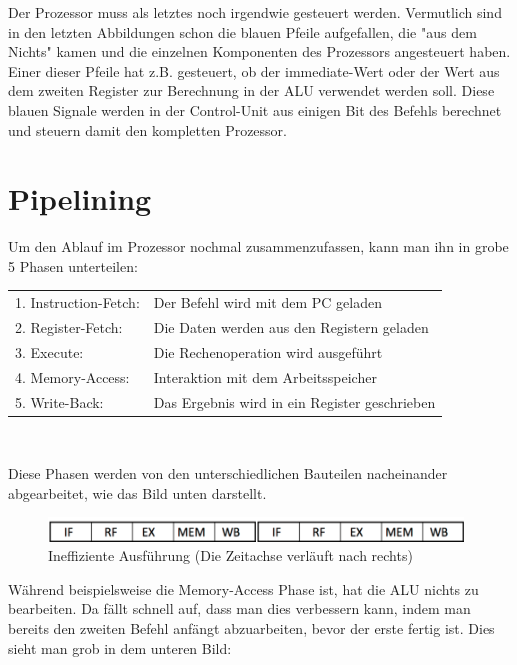 \documentclass[12pt, a4paper]{article}
\begin{document}
Der Prozessor muss als letztes noch irgendwie gesteuert werden. Vermutlich sind in den letzten Abbildungen schon die blauen Pfeile aufgefallen, die "aus dem Nichts" kamen und die einzelnen Komponenten des Prozessors angesteuert haben. Einer dieser Pfeile hat z.B. gesteuert, ob der immediate-Wert oder der Wert aus dem zweiten Register zur Berechnung in der ALU verwendet werden soll. Diese blauen Signale werden in der Control-Unit aus einigen Bit des Befehls berechnet und steuern damit den kompletten Prozessor.

\section{Pipelining}
Um den Ablauf im Prozessor nochmal zusammenzufassen, kann man ihn in grobe 5 Phasen unterteilen:

\begin{table}[H]
	\begin{tabular}{ll}
		1. Instruction-Fetch:&Der Befehl wird mit dem PC geladen \\
		2. Register-Fetch:&Die Daten werden aus den Registern geladen \\
		3. Execute:&Die Rechenoperation wird ausgeführt \\
		4. Memory-Access:&Interaktion mit dem Arbeitsspeicher \\
		5. Write-Back:&Das Ergebnis wird in ein Register geschrieben \\
	\end{tabular}\\
\end{table}

Diese Phasen werden von den unterschiedlichen Bauteilen nacheinander abgearbeitet, wie das Bild unten darstellt.

\begin{figure}[H]
	\begin{center}
		\includegraphics [width=11cm]{keinPipelining.png}
	\end{center}
	\caption{Ineffiziente Ausführung (Die Zeitachse verläuft nach rechts)}
\end{figure}

Während beispielsweise die Memory-Access Phase ist, hat die ALU nichts zu bearbeiten. Da fällt schnell auf, dass man dies verbessern kann, indem man bereits den zweiten Befehl anfängt abzuarbeiten, bevor der erste fertig ist. Dies sieht man grob in dem unteren Bild:
\end{document}
